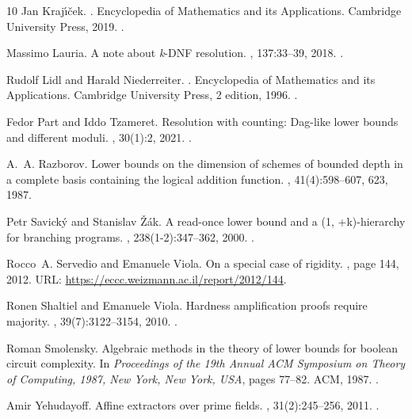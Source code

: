 \documentclass[10pt,a4paper]{article}
\theoremstyle{definition}
\theoremstyle{remark}
\begin{document}
\begin{thebibliography}{10}
Jan Kraj{\'\i}{\v c}ek.
.
\newblock Encyclopedia of Mathematics and its Applications. Cambridge
  University Press, 2019.
\newblock \href {https://doi.org/10.1017/9781108242066}
  {}.

Massimo Lauria.
\newblock A note about \emph{k}-{DNF} resolution.
, 137:33--39, 2018.
\newblock \href {https://doi.org/10.1016/j.ipl.2018.04.014}
  {}.

Rudolf Lidl and Harald Niederreiter.
.
\newblock Encyclopedia of Mathematics and its Applications. Cambridge
  University Press, 2 edition, 1996.
\newblock \href {https://doi.org/10.1017/CBO9780511525926}
  {}.

Fedor Part and Iddo Tzameret.
\newblock Resolution with counting: Dag-like lower bounds and different moduli.
, 30(1):2, 2021.
\newblock \href {https://doi.org/10.1007/s00037-020-00202-x}
  {}.

A.~A. Razborov.
\newblock Lower bounds on the dimension of schemes of bounded depth in a
  complete basis containing the logical addition function.
, 41(4):598--607, 623, 1987.

Petr Savick{\'{y}} and Stanislav {\v{Z}}{\'{a}}k.
\newblock A read-once lower bound and a (1, +k)-hierarchy for branching
  programs.
, 238(1-2):347--362, 2000.
\newblock \href {https://doi.org/10.1016/S0304-3975(98)00219-9}
  {}.

Rocco~A. Servedio and Emanuele Viola.
\newblock On a special case of rigidity.
, page 144, 2012.
\newblock URL: \url{https://eccc.weizmann.ac.il/report/2012/144}.

Ronen Shaltiel and Emanuele Viola.
\newblock Hardness amplification proofs require majority.
, 39(7):3122--3154, 2010.
\newblock \href {https://doi.org/10.1137/080735096}
  {}.

Roman Smolensky.
\newblock Algebraic methods in the theory of lower bounds for boolean circuit
  complexity.
\newblock In {\em Proceedings of the 19th Annual {ACM} Symposium on Theory of
  Computing, 1987, New York, New York, {USA}}, pages 77--82. {ACM}, 1987.
\newblock \href {https://doi.org/10.1145/28395.28404}
  {}.

Amir Yehudayoff.
\newblock Affine extractors over prime fields.
, 31(2):245--256, 2011.
\newblock \href {https://doi.org/10.1007/s00493-011-2604-9}
  {}.

\end{thebibliography}
\end{document}
